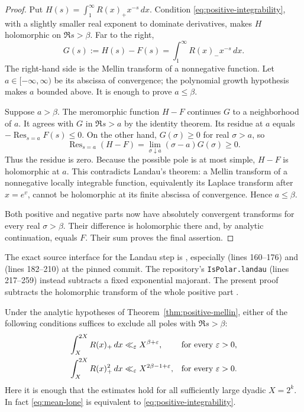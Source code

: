 \begin{proof}
Put $H(s)=\int_1^\infty R(x)_+x^{-s}\,dx$. Condition
\eqref{eq:positive-integrability}, with a slightly smaller real exponent to
dominate derivatives, makes $H$ holomorphic on $\Re s>\beta$. Far to the
right,
\[
 G(s):=H(s)-F(s)=\int_1^\infty R(x)_-x^{-s}\,dx.
\]
The right-hand side is the Mellin transform of a nonnegative function. Let
$a\in[-\infty,\infty)$ be its abscissa of convergence; the polynomial growth
hypothesis makes $a$ bounded above. It is enough to prove $a\le\beta$.

Suppose $a>\beta$. The meromorphic function $H-F$ continues $G$ to a
neighborhood of $a$. It agrees with $G$ in $\Re s>a$ by the identity theorem.
Its residue at $a$ equals $-\operatorname{Res}_{s=a}F(s)\le0$. On the other
hand, $G(\sigma)\ge0$ for real $\sigma>a$, so
\[
 \operatorname{Res}_{s=a}(H-F)
 =\lim_{\sigma\downarrow a}(\sigma-a)G(\sigma)\ge0.
\]
Thus the residue is zero. Because the possible pole is at most simple,
$H-F$ is holomorphic at $a$. This contradicts Landau's theorem: a Mellin
transform of a nonnegative locally integrable function, equivalently its
Laplace transform after $x=e^v$, cannot be holomorphic at its finite abscissa
of convergence. Hence $a\le\beta$.

Both positive and negative parts now have absolutely convergent transforms
for every real $\sigma>\beta$. Their difference is holomorphic there and,
by analytic continuation, equals $F$. Their sum proves the final assertion.
\end{proof}

The exact source interface for the Landau step is
, especially
(lines 160--176) and
(lines 182--210) at the pinned commit.  The repository's
\texttt{IsPolar.landau} (lines 217--259) instead subtracts a fixed
exponential majorant. The present proof subtracts the holomorphic transform
of the whole positive part \cite{landau}.

\begin{corollary}\label{cor:mean-versions}
Under the analytic hypotheses of Theorem~\ref{thm:positive-mellin}, either
of the following conditions suffices to exclude all poles with $\Re s>\beta$:
\begin{align}
 \int_X^{2X}R(x)_+\,dx&\ll_\varepsilon X^{\beta+\varepsilon},
       &&\hbox{for every }\varepsilon>0,\label{eq:mean-lone}\\
 \int_X^{2X}R(x)_+^2\,dx&\ll_\varepsilon X^{2\beta-1+\varepsilon},
       &&\hbox{for every }\varepsilon>0.\label{eq:mean-ltwo}
\end{align}
Here it is enough that the estimates hold for all sufficiently large
dyadic $X=2^k$. In fact \eqref{eq:mean-lone} is equivalent to
\eqref{eq:positive-integrability}.
\end{corollary}

